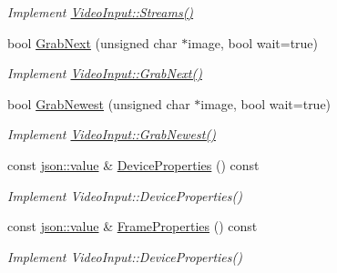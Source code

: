 \begin{DoxyCompactItemize}
\begin{DoxyCompactList}\small\item\em Implement \hyperlink{structpangolin_1_1_video_input_a9030d775d699c39ab7b7ba378c007c6a}{Video\+Input\+::\+Streams()} \end{DoxyCompactList}\item 
bool \hyperlink{classpangolin_1_1_depth_sense_video_a25a5e67d87443a9268e5845e72d29092}{Grab\+Next} (unsigned char $\ast$image, bool wait=true)\hypertarget{classpangolin_1_1_depth_sense_video_a25a5e67d87443a9268e5845e72d29092}{}\label{classpangolin_1_1_depth_sense_video_a25a5e67d87443a9268e5845e72d29092}

\begin{DoxyCompactList}\small\item\em Implement \hyperlink{structpangolin_1_1_video_input_ad3d8ff59c1ec4139320097e6e1111f32}{Video\+Input\+::\+Grab\+Next()} \end{DoxyCompactList}\item 
bool \hyperlink{classpangolin_1_1_depth_sense_video_a2ac3ea9e39741d607ed0792e23f83ede}{Grab\+Newest} (unsigned char $\ast$image, bool wait=true)\hypertarget{classpangolin_1_1_depth_sense_video_a2ac3ea9e39741d607ed0792e23f83ede}{}\label{classpangolin_1_1_depth_sense_video_a2ac3ea9e39741d607ed0792e23f83ede}

\begin{DoxyCompactList}\small\item\em Implement \hyperlink{structpangolin_1_1_video_input_a4c8ac38e3c6a3f591663aeebf645e4c6}{Video\+Input\+::\+Grab\+Newest()} \end{DoxyCompactList}\item 
const \hyperlink{classpangolin_1_1json_1_1value}{json\+::value} \& \hyperlink{classpangolin_1_1_depth_sense_video_a5c36ad7603c146e83546d203c685885b}{Device\+Properties} () const \hypertarget{classpangolin_1_1_depth_sense_video_a5c36ad7603c146e83546d203c685885b}{}\label{classpangolin_1_1_depth_sense_video_a5c36ad7603c146e83546d203c685885b}

\begin{DoxyCompactList}\small\item\em Implement Video\+Input\+::\+Device\+Properties() \end{DoxyCompactList}\item 
const \hyperlink{classpangolin_1_1json_1_1value}{json\+::value} \& \hyperlink{classpangolin_1_1_depth_sense_video_a474615f56505bf0fb635eb95dc8dbc3e}{Frame\+Properties} () const \hypertarget{classpangolin_1_1_depth_sense_video_a474615f56505bf0fb635eb95dc8dbc3e}{}\label{classpangolin_1_1_depth_sense_video_a474615f56505bf0fb635eb95dc8dbc3e}

\begin{DoxyCompactList}\small\item\em Implement Video\+Input\+::\+Device\+Properties() \end{DoxyCompactList}\end{DoxyCompactItemize}
